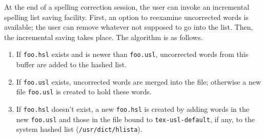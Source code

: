 At the end of a spelling correction session, the user can invoke
an incremental spelling list saving facility.
First, an option to reexamine uncorrected words is available; the user
can remove whatever not supposed to go into the list.
Then, the incremental saving takes place.
The algorithm is as follows.
\begin{enumerate}
\item If \verb|foo.hsl| exists and is newer than \verb|foo.usl|,
	uncorrected words from this buffer are added to the hashed list.
\item If \verb|foo.usl| exists, uncorrected words are merged into the file;
	otherwise a new file \verb|foo.usl| is created to hold these words.
\item If \verb|foo.hsl| doesn't exist, a new \verb|foo.hsl| is created by
	adding words in the new \verb|foo.usl| and those in the file bound to
	\verb|tex-usl-default|, if any, to the system hashed list
	(\verb|/usr/dict/hlista|).
\end{enumerate}


